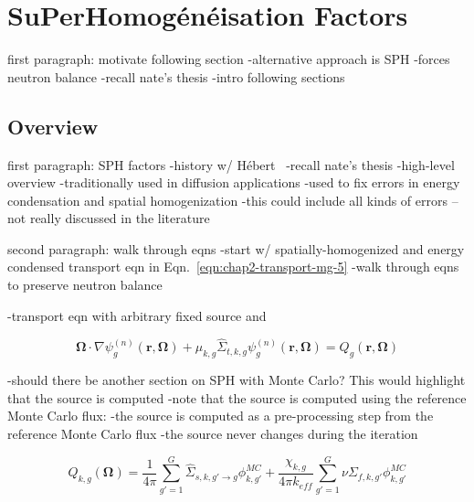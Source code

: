 \section{SuPerHomog\'{e}n\'{e}isation Factors}
\label{sec:chap5-sph}

first paragraph: motivate following section
-alternative approach is SPH
-forces neutron balance
-recall nate's thesis
-intro following sections

\subsection{Overview}
\label{subsec:chap5-sph-overview}

first paragraph: SPH factors
-history w/ H\'{e}bert~\cite{hebert1993consistent}\cite{hebert2005ribon}
-recall nate's thesis
-high-level overview
-traditionally used in diffusion applications
-used to fix errors in energy condensation and spatial homogenization
  -this could include all kinds of errors -- not really discussed in the literature

second paragraph: walk through eqns
-start w/ spatially-homogenized and energy condensed transport eqn in Eqn.~\ref{eqn:chap2-transport-mg-5}
-walk through eqns to preserve neutron balance

-transport eqn with arbitrary fixed source and 

\begin{dmath}
\label{eqn:chap6-sph-transport-eqn}
\mathbf{\Omega} \cdot \nabla \psi_{g}^{(n)}(\mathbf{r},\mathbf{\Omega}) + \mu_{k,g}\hat{\Sigma}_{t,k,g}\psi_{g}^{(n)}(\mathbf{r},\mathbf{\Omega}) = Q_{g}(\mathbf{r},\mathbf{\Omega})
\end{dmath}

-should there be another section on SPH with Monte Carlo? This would highlight that the source is computed
-note that the source is computed using the reference Monte Carlo flux:
-the source is computed as a pre-processing step from the reference Monte Carlo flux
-the source never changes during the iteration

\begin{dmath}
\label{eqn:chap6-sph-source}
Q_{k,g}(\mathbf{\Omega}) = \frac{1}{4\pi} \sum_{g'=1}^{G} \hat{\Sigma}_{s,k,g' \rightarrow g}\phi_{k,g'}^{MC} + \frac{\chi_{k,g}}{4\pi k_{eff}}\sum_{g'=1}^{G} \nu\Sigma_{f,k,g'}\phi_{k,g'}^{MC}
\end{dmath}

